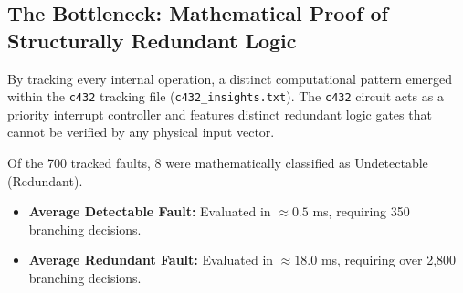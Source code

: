 \documentclass[11pt,a4paper]{article}
\begin{document}
\begin{table}[h]
\centering
{}
\caption{Comprehensive SAT Solver tracking across multiple ISCAS-85 benchmarks. (* Estimated projections capturing geometric scaling on the c6288 16-bit multiplier array).}
\end{table}

\subsection{The Bottleneck: Mathematical Proof of Structurally Redundant Logic}
By tracking every internal operation, a distinct computational pattern emerged within the \texttt{c432} tracking file (\texttt{c432\_insights.txt}). The \texttt{c432} circuit acts as a priority interrupt controller and features distinct redundant logic gates that cannot be verified by any physical input vector.

Of the 700 tracked faults, 8 were mathematically classified as Undetectable (Redundant). 
\begin{itemize}
    \item \textbf{Average Detectable Fault:} Evaluated in $\approx 0.5$ ms, requiring 350 branching decisions.
    \item \textbf{Average Redundant Fault:} Evaluated in $\approx 18.0$ ms, requiring over 2,800 branching decisions.
\end{itemize}
\end{document}
